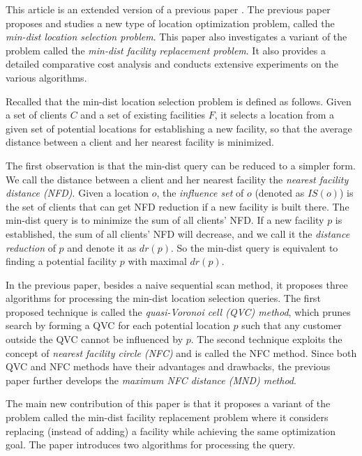 \documentclass[paper=a4, fontsize=18pt]{article} %
\numberwithin{equation}{section} %
\numberwithin{figure}{section} %
\numberwithin{table}{section} %
\begin{document}
This article is an extended version of a previous paper \cite{QZKLX12}. The previous paper proposes and studies a new type of location optimization problem, called the \emph{min-dist location selection problem}. This paper also investigates a variant of the problem called the \emph{min-dist facility replacement problem}. It also provides a detailed comparative cost analysis and conducts extensive experiments on the various algorithms.

Recalled that the min-dist location selection problem is defined as follows. Given a set of clients $C$ and a set of existing facilities $F$, it selects a location from a given set of potential locations for establishing a new facility, so that the average distance between a client and her nearest facility is minimized.

The first observation is that the min-dist query can be reduced to a simpler form. We call the distance between a client and her nearest facility the \emph{nearest facility distance (NFD)}. Given a location $o$, the \emph{influence set} of $o$ (denoted as $IS(o)$) is the set of clients that can get NFD reduction if a new facility is built there. The min-dist query is to minimize the sum of all clients' NFD. If a new facility $p$ is established, the sum of all clients' NFD will decrease, and we call it the \emph{distance reduction} of $p$ and denote it as $dr(p)$. So the min-dist query is equivalent to finding a potential facility $p$ with maximal $dr(p)$.

In the previous paper, besides a naive sequential scan method, it proposes three algorithms for processing the min-dist location selection queries. The first proposed technique is called the \emph{quasi-Voronoi cell (QVC) method}, which prunes search by forming a QVC for each potential location $p$ such that any customer outside the QVC cannot be influenced by $p$. The second technique exploits the concept of \emph{nearest facility circle (NFC)} and is called the NFC method. Since both QVC and NFC methods have their advantages and drawbacks, the previous paper further develops the \emph{maximum NFC distance (MND) method}.

The main new contribution of this paper is that it proposes a variant of the problem called the min-dist facility replacement problem where it considers replacing (instead of adding) a facility while achieving the same optimization goal. The paper introduces two algorithms for processing the query.
\end{document}
